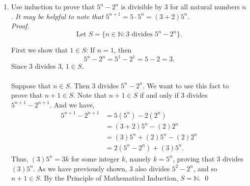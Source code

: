 \documentclass[12pt]{article}
\begin{document}
\begin{enumerate}
Then, since $n$ is a natural number, $2^n$ must be greater than 1. Thus, we have shown that the inequality holds for $n+1$, and therefore that $n+1\in S$.  Now, by the Principle of Mathematical Induction, we have shown that $2^n + 1 < 2^{n+1} - 1$ for all natural numbers $n \geq 2$. \qed\\


\item Use induction to prove that $5^n - 2^n$ is divisible by 3 for all natural numbers $n$. \emph{It may be helpful to note that $5^{n+1} = 5\cdot 5^n = (3+2)5^n$.} \\

\emph{Proof.}  \[\text{Let } S = \bigg \{n \in \mathbb{N}: 3 \text{ divides } 5^n-2^n \bigg \}. \]
    
    First we show that $1 \in S$: If $n=1$, then
    \[5^n-2^n = 5^1-2^1 = 5-2 = 3.\]
    Since $3$ divides $3$, $1 \in S$. \\ \\
    Suppose that $n \in S$. Then $3$ divides $5^n-2^n$. We want to use this fact to prove that $n+1 \in S$. Note that $n+1 \in S$ if and only if $3$ divides $5^{n+1}-2^{n+1}$. And we have,
    \begin{align*}
        5^{n+1}-2^{n+1} &= 5(5^n)-2(2^n) \\
        &= (3+2)5^n-(2)2^n \\
        &= (3)5^n+(2)5^n-(2)2^n \\
        &= 2(5^n-2^n)+(3)5^n.
    \end{align*}
    Thus, $(3)5^n=3k$ for some integer $k$, namely $k=5^n$, proving that $3$ divides $(3)5^n$. As we have previously shown, $3$ also divides $5^2-2^n$, and so $n+1 \in S$. By the Principle of Mathematical Induction, $S=\mathbb{N}$. \qed

\end{enumerate}
\end{document}
